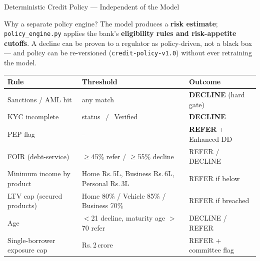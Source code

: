 \documentclass[9pt,aspectratio=169]{beamer}
\begin{document}
\begin{frame}{Deterministic Credit Policy --- Independent of the Model}
\vspace{-2pt}
\begin{block}{Why a separate policy engine?}
  \footnotesize
  The model produces a \textbf{risk estimate}; \texttt{policy\_engine.py} applies the bank's
  \textbf{eligibility rules and risk-appetite cutoffs}. A decline can be proven to a regulator
  as policy-driven, not a black box --- and policy can be re-versioned (\texttt{credit-policy-v1.0})
  without ever retraining the model.
\end{block}
\vspace{5pt}
\begin{center}
\footnotesize
\begin{tabular}{lll}
  \toprule
  \textbf{Rule} & \textbf{Threshold} & \textbf{Outcome}\\
  \midrule
  Sanctions / AML hit         & any match                      & \textbf{DECLINE} (hard gate)\\
  KYC incomplete              & status $\neq$ Verified          & \textbf{DECLINE}\\
  PEP flag                    & --                              & \textbf{REFER} + Enhanced DD\\
  FOIR (debt-service)         & $\geq$45\% refer / $\geq$55\% decline & REFER / DECLINE\\
  Minimum income by product   & Home Rs.\,5L, Business Rs.\,6L, Personal Rs.\,3L & REFER if below\\
  LTV cap (secured products)  & Home 80\% / Vehicle 85\% / Business 70\% & REFER if breached\\
  Age                         & $<$21 decline, maturity age $>$70 refer & DECLINE / REFER\\
  Single-borrower exposure cap & Rs.\,2\,crore                      & REFER + committee flag\\
  \bottomrule
\end{tabular}
\end{center}
\end{frame}
\end{document}
